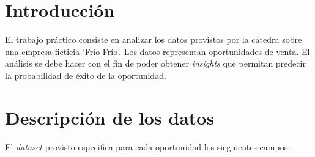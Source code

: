 \documentclass[titlepage,a4paper]{article}
\begin{document}
\tableofcontents %
\newpage
\section{Introducción}\label{sec:intro}
El trabajo práctico consiste en analizar los datos provistos por la cátedra sobre una empresa ficticia `Frío Frío'. Los datos representan oportunidades de venta. El análisis se debe hacer con el fin de poder obtener \textit{insights} que permitan predecir la probabilidad de éxito de la oportunidad.

\section{Descripción de los datos}\label{sec:desc_datos}
El \textit{dataset} provisto especifica para cada oportunidad los sieguientes campos:
\end{document}
